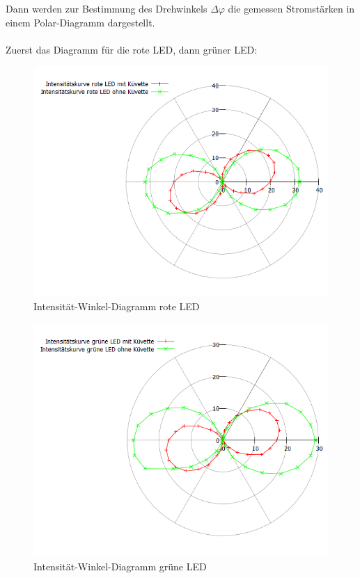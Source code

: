 \documentclass[fontsize=12pt]{scrartcl}
\begin{document}
\noindent
Dann werden zur Bestimmung des Drehwinkels $\Delta\varphi$ die gemessen 
Stromstärken in einem Polar-Diagramm dargestellt. \\
~\\
Zuerst das Diagramm für die rote LED, dann grüner LED:
\begin{figure}[H]
\vspace{-12pt}
		\includegraphics[scale=0.75]{Graphik/PolarroteLED}
		\vspace{-15pt}
		\caption{Intensität-Winkel-Diagramm rote LED}
\end{figure}
\begin{figure}[H]
\vspace{-17pt}
        \includegraphics[scale=0.75]{Graphik/PolargruneLED}
        \vspace{-10pt}
		\caption{Intensität-Winkel-Diagramm grüne LED}
\end{figure}
\end{document}
